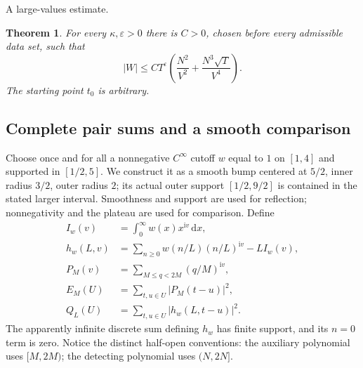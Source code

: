 \documentclass[11pt,a4paper]{article}
\numberwithin{equation}{section}
\newtheorem{theorem}{Theorem}[section]
\theoremstyle{definition}
\newcommand{\dd}{\,\mathrm d}
\newcommand{\ii}{\mathrm i}
\begin{document}
\par\medskip\noindent A large-values estimate.
\begin{theorem}\label{thm:LV}
For every $\kappa,\varepsilon>0$ there is $C>0$, chosen before every admissible
data set, such that
\[
 |W|\le C T^\varepsilon\left(\frac{N^2}{V^2}
              +\frac{N^3\sqrt T}{V^4}\right).
\]
The starting point $t_0$ is arbitrary.
\end{theorem}

\subsection{Complete pair sums and a smooth comparison}
Choose once and for all a nonnegative $C^\infty$ cutoff $w$ equal to $1$ on
$[1,4]$ and supported in $[1/2,5]$. We construct it as a smooth bump
centered at $5/2$, inner radius $3/2$, outer radius $2$; its actual outer
support $[1/2,9/2]$ is contained in the stated larger interval.
Smoothness and support are used for reflection; nonnegativity and the plateau
are used for comparison.
Define
\begin{align*}
 I_w(v)&=\int_0^\infty w(x)x^{\ii v}\dd x,\\
 h_w(L,v)&=\sum_{n\ge0}w(n/L)(n/L)^{\ii v}-LI_w(v),\\
 P_M(v)&=\sum_{M\le q<2M}(q/M)^{\ii v},\\
 E_M(U)&=\sum_{t,u\in U}|P_M(t-u)|^2,\\
 Q_L(U)&=\sum_{t,u\in U}|h_w(L,t-u)|^2.
\end{align*}
The apparently infinite discrete sum defining $h_w$ has finite support, and its
$n=0$ term is zero. Notice the distinct half-open conventions: the auxiliary
polynomial uses $[M,2M)$; the detecting polynomial uses $(N,2N]$.
\end{document}
